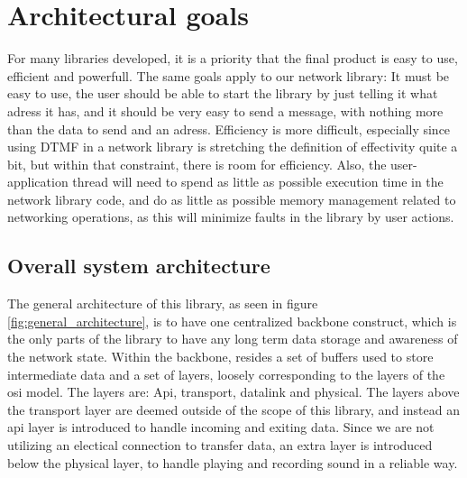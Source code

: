 \section{Architectural goals}
For many libraries developed, it is a priority that the final product is easy to use, efficient and powerfull.  The same goals apply to our network library: It must be easy to use, the user should be able to start the library by just telling it what adress it has, and it should be very easy to send a message, with nothing more than the data to send and an adress. Efficiency is more difficult, especially since using DTMF in a network library is stretching the definition of effectivity quite a bit, but within that constraint, there is room for efficiency.
Also, the user-application thread will need to spend as little as possible execution time in the network library code, and do as little as possible memory management related to networking operations, as this will minimize faults in the library by user actions.



\subsection{Overall system architecture}
The general architecture of this library, as seen in figure \ref{fig:general_architecture}, is to have one centralized backbone construct, which is the only parts of the library to have any long term data storage and awareness of the network state. 
Within the backbone, resides a set of buffers used to store intermediate data and a set of layers, loosely corresponding to the layers of the osi model.
The layers are: Api, transport, datalink and physical.
The layers above the transport layer are deemed outside of the scope of this library, and instead an api layer is introduced to handle incoming and exiting data. Since we are not utilizing an electical connection to transfer data, an extra layer is introduced below the physical layer, to handle playing and recording sound in a reliable way.









